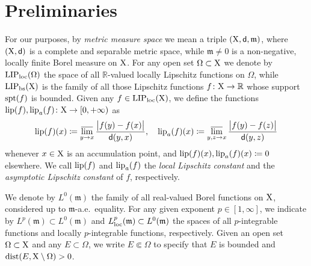 \documentclass[reqno]{amsart}
\numberwithin{equation}{section}
\newcommand{\R}{\mathbb{R}}
\newcommand{\X}{{\rm X}}
\newcommand{\sfd}{{\sf d}}
\newcommand{\mm}{\mathfrak m}
\newcommand{\1}{\mathbbm 1}
\newcommand{\lims}{\varlimsup}
\newcommand{\LIP}{{\rm LIP}}
\newcommand{\lip}{{\rm lip}}
\newcommand{\loc}{{\rm loc}}
\begin{document}
\section{Preliminaries}\label{s:preliminaries}
%
%
For our purposes, by \emph{metric measure space} we mean a triple \((\X,\sfd,\mm)\),
where \((\X,\sfd)\) is a complete and separable metric space, while \(\mm\neq 0\)
is a non-negative, locally finite Borel measure on \(\X\). For any open set
\(\Omega\subset\X\) we denote by \(\LIP_\loc(\Omega)\) the space of all \(\R\)-valued
locally Lipschitz functions on \(\Omega\), while \(\LIP_{\rm bs}(\X)\) is
the family of all those Lipschitz functions \(f\colon\X\to\R\) whose support
\({\rm spt}(f)\) is bounded. Given any \(f\in\LIP_\loc(\X)\), we define the functions
\(\lip(f),\lip_a(f)\colon\X\to[0,+\infty)\) as
\[
\lip(f)(x)\coloneqq\lims_{y\to x}\frac{\big|f(y)-f(x)\big|}{\sfd(y,x)},
\quad\lip_a(f)(x)\coloneqq\lims_{y,z\to x}\frac{\big|f(y)-f(z)\big|}{\sfd(y,z)}
\]
whenever \(x\in\X\) is an accumulation point, and \(\lip(f)(x),\lip_a(f)(x)\coloneqq 0\)
elsewhere. We call \(\lip(f)\) and \(\lip_a(f)\) the
\emph{local Lipschitz constant} and the \emph{asymptotic Lipschitz constant}
of \(f\), respectively.

We denote by \(L^0(\mm)\) the family of all real-valued Borel functions
on \(\X\), considered up to \(\mm\)-a.e.\ equality. For any given exponent
\(p\in[1,\infty]\), we indicate by \(L^p(\mm)\subset L^0(\mm)\)
and \(L^p_\loc(\mm)\subset L^0(\mm)\) the spaces of all \(p\)-integrable
functions and locally \(p\)-integrable functions, respectively. Given an
open set \(\Omega\subset\X\) and any \(E\subset\Omega\),
we write \(E\Subset\Omega\) to specify that \(E\) is bounded
and \({\rm dist}(E,\X\setminus\Omega)>0\).
%
%
%
%
\end{document}
